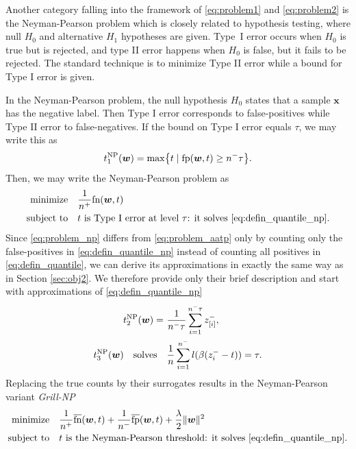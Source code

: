 \documentclass[]{interact}
\theoremstyle{plain}%
\theoremstyle{definition}
\theoremstyle{remark}
\let\originalleft\left
\let\originalright\right
\renewcommand{\left}{\mathopen{}\mathclose\bgroup\originalleft}
\renewcommand{\right}{\aftergroup\egroup\originalright}
\newcommand{\norm}[1]{\|#1\|}
\newcommand{\npA}{\emph{Grill-NP}\xspace}
\newcommand{\fp}{\textnormal{fp}}
\newcommand{\fn}{\textnormal{fn}}
\newcommand{\fps}{\overline{\textnormal{fp}}}
\newcommand{\fns}{\overline{\textnormal{fn}}}
\begin{document}
Another category falling into the framework of \eqref{eq:problem1} and \eqref{eq:problem2} is the Neyman-Pearson problem which is closely related to hypothesis testing, where null $H_0$ and alternative $H_1$ hypotheses are given. Type~I error occurs when $H_0$ is true but is rejected, and type II error happens when $H_0$ is false, but it fails to be rejected. The standard technique is to minimize Type II error while a bound for Type I error is given.

In the Neyman-Pearson problem, the null hypothesis $H_0$ states that a sample $\bm x$ has the negative label. Then Type I error corresponds to false-positives while Type II error to false-negatives. If the bound on Type I error equals $\tau$, we may write this as
\begin{equation}\label{eq:defin_quantile_np} 
t_1^{\rm NP}(\bm w) = \max\left\{t\mid \fp(\bm w,t)\ge n^-\tau\right\}.
\end{equation}
Then, we may write the Neyman-Pearson problem as
\begin{equation}\label{eq:problem_np}
\aligned
{\rm minimize} & \quad \frac{1}{n^{+}}\fn(\bm w,t) \\
\textnormal{subject to} & \quad t\text{ is Type I error at level \ensuremath{\tau}: it solves }\eqref{eq:defin_quantile_np}.
\endaligned
\end{equation}
Since \eqref{eq:problem_np} differs from \eqref{eq:problem_aatp} only by counting only the false-positives in \eqref{eq:defin_quantile_np} instead of counting all positives in \eqref{eq:defin_quantile}, we can derive its approximations in exactly the same way as in Section \ref{sec:obj2}. We therefore provide only their brief description and start with approximations of \eqref{eq:defin_quantile_np}
\begin{align}
\label{eq:defin_quantile1_np}t_2^{\rm NP}(\bm w) =\ &\frac{1}{n^-\tau}\sum_{i=1}^{n^-\tau} z_{[i]}^-, \\
\label{eq:defin_quantile0_np} t_3^{\rm NP}(\bm w)\quad \text{solves} \quad &\frac1n\sum_{i=1}^{n^-}l(\beta(z_i^--t)) = \tau.
\end{align}
Replacing the true counts by their surrogates results in the Neyman-Pearson variant \npA
\begin{equation}\label{eq:problem_grill_np}
\aligned
{\rm minimize} & \quad \frac{1}{n^{+}}\fns(\bm w,t) + \frac{1}{n^{-}}\fps(\bm w,t) + \frac\lambda2\norm{\bm w}^2\\
\textnormal{subject to} & \quad t\text{ is the Neyman-Pearson threshold: it solves }\eqref{eq:defin_quantile_np}.
\endaligned
\end{equation}
\end{document}

